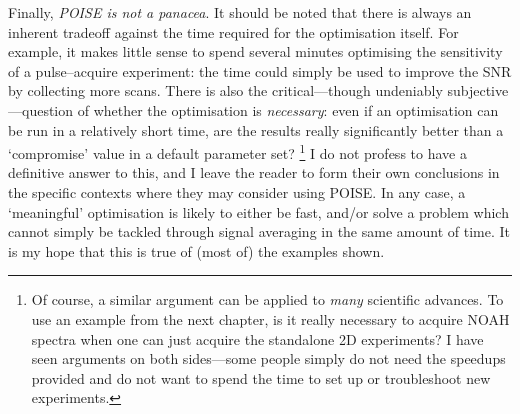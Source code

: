 Finally, \textit{POISE is not a panacea}.
It should be noted that there is always an inherent tradeoff against the time required for the optimisation itself.
For example, it makes little sense to spend several minutes optimising the sensitivity of a pulse--acquire experiment: the time could simply be used to improve the SNR by collecting more scans.
There is also the critical---though undeniably subjective---question of whether the optimisation is \textit{necessary}: even if an optimisation can be run in a relatively short time, are the results really significantly better than a `compromise' value in a default parameter set?%
\footnote{Of course, a similar argument can be applied to \textit{many} scientific advances. To use an example from the next chapter, is it really necessary to acquire NOAH spectra when one can just acquire the standalone 2D experiments? I have seen arguments on both sides---some people simply do not need the speedups provided and do not want to spend the time to set up or troubleshoot new experiments.}
I do not profess to have a definitive answer to this, and I leave the reader to form their own conclusions in the specific contexts where they may consider using POISE.
In any case, a `meaningful' optimisation is likely to either be fast, and/or solve a problem which cannot simply be tackled through signal averaging in the same amount of time.
It is my hope that this is true of (most of) the examples shown.
